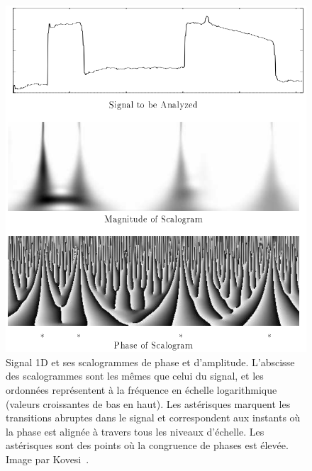 \begin{figure}
    \centering
    \includegraphics[width=.85\textwidth]{contenu/resources/images/phase_congruence_scalogram}
    \caption[Scalogramme d'un signal mettant en évidence des points caractéristiques du signal]{Signal 1D et ses scalogrammes de phase et d'amplitude. L'abscisse des scalogrammes sont les mêmes que celui du signal, et les ordonnées représentent à la fréquence en échelle logarithmique (valeurs croissantes de bas en haut). Les astérisques marquent les transitions abruptes dans le signal et correspondent aux instants où la phase est alignée à travers tous les niveaux d'échelle. Les astérisques sont des points où la congruence de phases est élevée. Image par Kovesi~\cite{kovesi_image_1995}.}
    \label{fig:phase-congruence-scalogram}
\end{figure}

